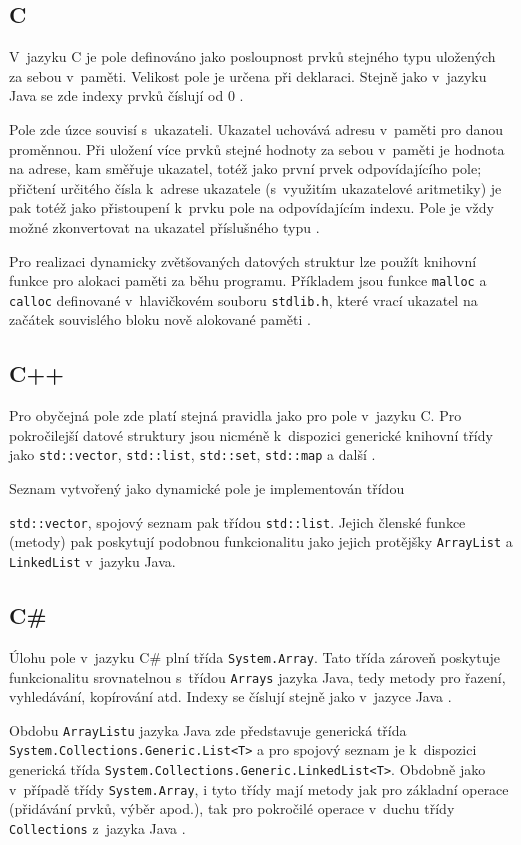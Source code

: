\documentclass{bakalarka}
\begin{document}
\subsection{C}
V~jazyku C je pole definováno jako posloupnost prvků stejného typu uložených za sebou v~paměti. Velikost pole je určena při deklaraci. Stejně jako v~jazyku Java se zde indexy prvků číslují od 0 \cite{cpp-guide-array}.\par
Pole zde úzce souvisí s~ukazateli. Ukazatel uchovává adresu v~paměti pro danou proměnnou. Při uložení více prvků stejné hodnoty za sebou v~paměti je hodnota na adrese, kam směřuje ukazatel, totéž jako první prvek odpovídajícího pole; přičtení určitého čísla k~adrese ukazatele (s~využitím ukazatelové aritmetiky) je pak totéž jako přistoupení k~prvku pole na odpovídajícím indexu. Pole je vždy možné zkonvertovat na ukazatel příslušného typu \cite{cpp-guide-pointer}.\par
Pro realizaci dynamicky zvětšovaných datových struktur lze použít knihovní funkce pro alokaci paměti za běhu programu. Příkladem jsou funkce \texttt{malloc} a \texttt{calloc} definované v~hlavičkovém souboru \texttt{stdlib.h}, které vrací ukazatel na začátek souvislého bloku nově alokované paměti \cite{cpp-guide-malloc, cpp-guide-calloc}.

\subsection{C++}
Pro obyčejná pole zde platí stejná pravidla jako pro pole v~jazyku C. Pro pokročilejší datové struktury jsou nicméně k~dispozici generické knihovní třídy jako \texttt{std::vector}, \texttt{std::list}, \texttt{std::set}, \texttt{std::map} a další \cite{cpp-guide-vector, cpp-guide-list, cpp-guide-set, cpp-guide-map}.\par
Seznam vytvořený jako dynamické pole je implementován třídou \par\noindent\texttt{std::vector}, spojový seznam pak třídou \texttt{std::list}. Jejich členské funkce (metody) pak poskytují podobnou funkcionalitu jako jejich protějšky \texttt{ArrayList} a \texttt{LinkedList} v~jazyku Java.  \cite{cpp-guide-vector, cpp-guide-list}

\subsection{C\#}
Úlohu pole v~jazyku C\# plní třída \texttt{System.Array}. Tato třída zároveň poskytuje funkcionalitu srovnatelnou s~třídou \texttt{Arrays} jazyka Java, tedy metody pro řazení, vyhledávání, kopírování atd. Indexy se číslují stejně jako v~jazyce Java \cite{cs-guide-array-tutorial, cs-guide-array}.\par
Obdobu \texttt{ArrayListu} jazyka Java zde představuje generická třída \texttt{System.Collections.Generic.List<T>} a pro spojový seznam je k~dispozici generická třída \texttt{System.Collections.Generic.LinkedList<T>}. Obdobně jako v~případě třídy \texttt{System.Array}, i tyto třídy mají metody jak pro základní operace (přidávání prvků, výběr apod.), tak pro pokročilé operace v~duchu třídy \texttt{Collections} z~jazyka Java \cite{cs-guide-list, cs-guide-linkedlist}.
\end{document}
